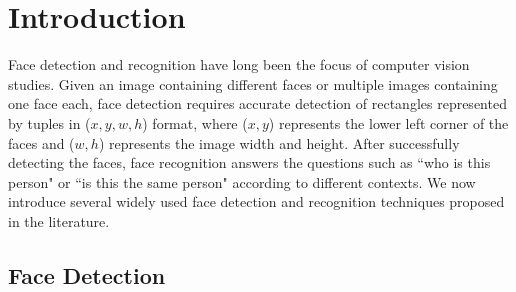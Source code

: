 \section{Introduction}
Face detection and recognition have long been the focus of computer vision studies. Given an image containing different faces or multiple images containing one face each, face detection requires accurate detection of rectangles represented by tuples in ($x, y, w, h$) format, where ($x, y$) represents the lower left corner of the faces and ($w,h$) represents the image width and height. After successfully detecting the faces, face recognition answers the questions such as ``who is this person" or ``is this the same person" according to different contexts. We now introduce several widely used face detection and recognition techniques proposed in the literature.


\subsection{Face Detection}
